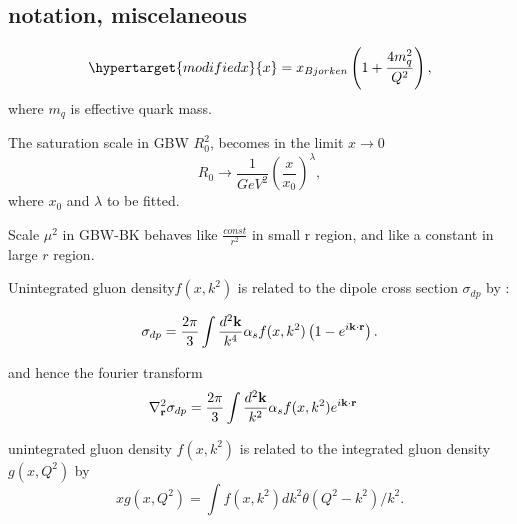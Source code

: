 \subsection{notation, miscelaneous}


\begin{equation}
\hypertarget{modifiedx}{x}=x_{Bjorken}\left(1+\frac{4m^2_q}{Q^2}\right),
\end{equation}
where $m_q$ is effective quark mass. 



The saturation scale in GBW \hypertarget{saturationscaleGBW}{$R^2_0$}, becomes in the limit $x\rightarrow 0$
\begin{equation}
R_0\rightarrow \frac{1}{GeV^2}\left(\frac{x}{x_0}\right)^\lambda,
\end{equation}
where $x_0$ and $\lambda$ to be fitted.

Scale $\mu^2$ in GBW-BK behaves like $\frac{const}{r^2}$ in small r region, and like a constant in large $r$ region.

Unintegrated gluon density\hypertarget{ugd}{$f(x,k^2)$} is related to the dipole cross section $\sigma_{dp}$ by%
\cite{gbk2002}\cite{nikolaev1994}:

\begin{equation}
\sigma_{dp}=\frac{2 \pi}{3} \int\frac{d^2 \mathbf{k}}{k^4} \alpha_s f(x,k^2) \left(1-e^{i \mathbf{k}\cdot\mathbf{r}}\right).
\end{equation}

and hence the fourier transform
\begin{align}
\nabla^2_{\mathbf{r}} \sigma_{dp}&=\frac{2 \pi}{3} \int\frac{d^2 \mathbf{k}}{k^2} \alpha_s f(x,k^2)  e^{i \mathbf{k}\cdot\mathbf{r}}
\end{align}

unintegrated gluon density $f(x,k^2)$ is related to the integrated gluon density $g(x,Q^2)$ by 
 \begin{equation}
x g (x,Q^2)=\int f(x,k^2)d k^2 \theta(Q^2-k^2)/k^2.
\end{equation}
